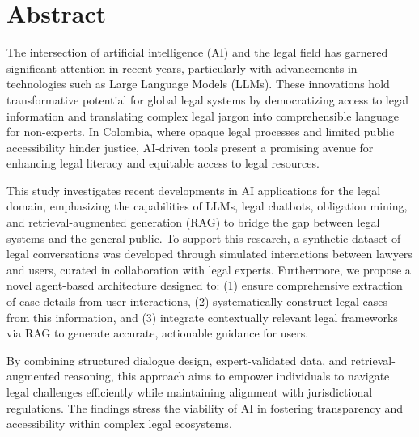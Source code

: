 
\chapter{Abstract}
The intersection of artificial intelligence (AI) and 
the legal field has garnered significant attention in 
recent years, particularly with advancements in technologies 
such as Large Language Models (LLMs). 
These innovations hold transformative potential for 
global legal systems by democratizing access to legal 
information and translating complex legal jargon into 
comprehensible language for non-experts. 
In Colombia, where opaque legal processes and 
limited public accessibility hinder justice, 
AI-driven tools present a promising avenue for enhancing 
legal literacy and equitable access to legal resources.

This study investigates recent developments in AI applications 
for the legal domain, emphasizing the capabilities of LLMs, 
legal chatbots, obligation mining, and retrieval-augmented generation (RAG) 
to bridge the gap between legal systems and the general public. 
To support this research, a synthetic dataset of legal conversations 
was developed through simulated interactions between lawyers and users, 
curated in collaboration with legal experts. 
Furthermore, we propose a novel agent-based architecture designed to: 
(1) ensure comprehensive extraction of case details from user interactions, 
(2) systematically construct legal cases from this information, 
and (3) integrate contextually relevant legal frameworks via RAG to 
generate accurate, actionable guidance for users.

By combining structured dialogue design, expert-validated data, 
and retrieval-augmented reasoning, this approach aims to empower 
individuals to navigate legal challenges efficiently while maintaining 
alignment with jurisdictional regulations. The findings stress the 
viability of AI in fostering transparency and accessibility within complex legal ecosystems. 
\endinput


